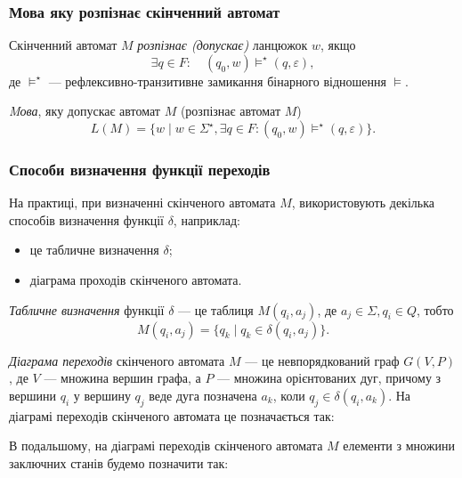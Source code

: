 \subsubsection{Мова яку розпізнає скінченний автомат}

Скінченний автомат $M$ \textit{розпізнає (допускає)} ланцюжок $w$, якщо
\begin{equation}
	\exists q \in F: \quad (q_0, w) \models^\star (q, \varepsilon),
\end{equation}
де $\models^\star$ --- рефлексивно-транзитивне замикання бінарного відношення $\models$. \medskip

\textit{Mова}, яку допускає автомат $M$ (розпізнає автомат $M$)
\begin{equation}
	L(M) = \{w \mid w \in \Sigma^\star, \exists q \in F: (q_0, w) \models^\star (q, \varepsilon)\}.
\end{equation}

\subsubsection{Способи визначення функції переходів}

На практиці, при визначенні скінченого автомата $M$, використовують декілька способів визначення функції $\delta$, наприклад: 
\begin{itemize}
	\item це табличне визначення $\delta$;
	\item діаграма проходів скінченого автомата.
\end{itemize}

\textit{Табличне визначення} функції $\delta$ --- це таблиця $M(q_i, a_j)$, де $a_j \in \Sigma, q_i \in Q$, тобто
\begin{equation}
	M(q_i, a_j) = \{ q_k \mid q_k \in \delta(q_i, a_j) \}.
\end{equation}

\textit{Діаграма переходів} скінченого автомата $M$ --- це невпорядкований граф $G(V, P)$, де $V$ --- множина вершин графа, а $P$ --- множина орієнтованих дуг, причому з вершини $q_i$ у вершину $q_j$ веде дуга позначена $a_k$, коли $q_j \in \delta(q_i, a_k)$. На діаграмі переходів скінченого автомата це позначається так:
\begin{figure}[H]
	\centering
	
\end{figure}

В подальшому, на діаграмі переходів скінченого автомата $M$ елементи з множини заключних станів будемо позначити так:
\begin{figure}[H]
	\centering
	
\end{figure}

